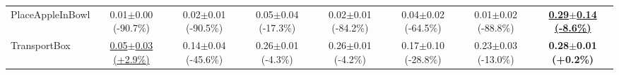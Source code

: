\begin{table}[htbp]
\begin{adjustbox}{max width=\textwidth}
\begin{tabular}{l*{7}{c}}
PlaceAppleInBowl & 0.01$\pm$0.00 \scriptsize{(-90.7\%)} & 0.02$\pm$0.01 \scriptsize{(-90.5\%)} & 0.05$\pm$0.04 \scriptsize{(-17.3\%)} & 0.02$\pm$0.01 \scriptsize{(-84.2\%)} & 0.04$\pm$0.02 \scriptsize{(-64.5\%)} & 0.01$\pm$0.02 \scriptsize{(-88.8\%)} & \textbf{\underline{0.29$\pm$0.14 \scriptsize{(-8.6\%)}}} \\
TransportBox & \underline{0.05$\pm$0.03 \scriptsize{(+2.9\%)}} & 0.14$\pm$0.04 \scriptsize{(-45.6\%)} & 0.26$\pm$0.01 \scriptsize{(-4.3\%)} & 0.26$\pm$0.01 \scriptsize{(-4.2\%)} & 0.17$\pm$0.10 \scriptsize{(-28.8\%)} & 0.23$\pm$0.03 \scriptsize{(-13.0\%)} & \textbf{0.28$\pm$0.01 \scriptsize{(+0.2\%)}} \\
\bottomrule
\end{tabular}
\end{adjustbox}
\end{table}

